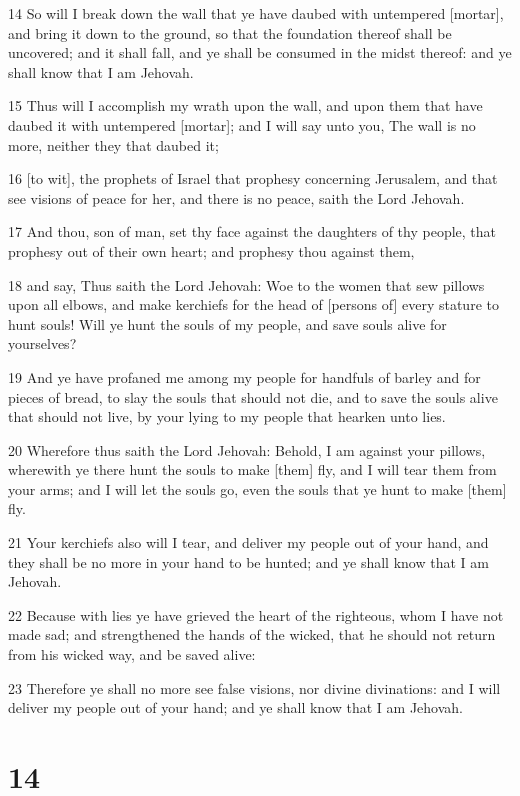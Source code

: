 \par 14 So will I break down the wall that ye have daubed with untempered [mortar], and bring it down to the ground, so that the foundation thereof shall be uncovered; and it shall fall, and ye shall be consumed in the midst thereof: and ye shall know that I am Jehovah.
\par 15 Thus will I accomplish my wrath upon the wall, and upon them that have daubed it with untempered [mortar]; and I will say unto you, The wall is no more, neither they that daubed it;
\par 16 [to wit], the prophets of Israel that prophesy concerning Jerusalem, and that see visions of peace for her, and there is no peace, saith the Lord Jehovah.
\par 17 And thou, son of man, set thy face against the daughters of thy people, that prophesy out of their own heart; and prophesy thou against them,
\par 18 and say, Thus saith the Lord Jehovah: Woe to the women that sew pillows upon all elbows, and make kerchiefs for the head of [persons of] every stature to hunt souls! Will ye hunt the souls of my people, and save souls alive for yourselves?
\par 19 And ye have profaned me among my people for handfuls of barley and for pieces of bread, to slay the souls that should not die, and to save the souls alive that should not live, by your lying to my people that hearken unto lies.
\par 20 Wherefore thus saith the Lord Jehovah: Behold, I am against your pillows, wherewith ye there hunt the souls to make [them] fly, and I will tear them from your arms; and I will let the souls go, even the souls that ye hunt to make [them] fly.
\par 21 Your kerchiefs also will I tear, and deliver my people out of your hand, and they shall be no more in your hand to be hunted; and ye shall know that I am Jehovah.
\par 22 Because with lies ye have grieved the heart of the righteous, whom I have not made sad; and strengthened the hands of the wicked, that he should not return from his wicked way, and be saved alive:
\par 23 Therefore ye shall no more see false visions, nor divine divinations: and I will deliver my people out of your hand; and ye shall know that I am Jehovah.

\chapter{14}

